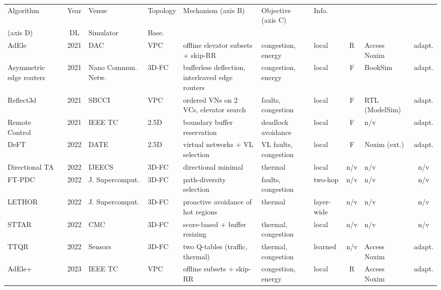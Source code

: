 \begin{tabularx}{\linewidth}{@{}>{\raggedright\arraybackslash}p{2.35cm}c>{\raggedright\arraybackslash}p{1.9cm}>{\raggedright\arraybackslash}p{1.35cm}>{\raggedright\arraybackslash}X>{\raggedright\arraybackslash}p{2.0cm}>{\raggedright\arraybackslash}p{1.3cm}c>{\raggedright\arraybackslash}p{1.45cm}c@{}}
\toprule
Algorithm & Year & Venue & Topology & Mechanism (axis B) & Objective (axis C) & Info.\\ (axis D) & DL & Simulator & Base. \\
\midrule
AdEle~\cite{taheri2021adele} & 2021 & DAC & VPC & offline elevator subsets + skip-RR & congestion, energy & local & R & Access Noxim & adapt. \\
Asymmetric edge routers~\cite{kunthara2021edge} & 2021 & Nano Commun. Netw. & 3D-FC & bufferless deflection, interleaved edge routers & congestion, energy & local & F & BookSim & adapt. \\
Reflect3d~\cite{silva2021reflect3d} & 2021 & SBCCI & VPC & 4 ordered VNs on 2 VCs, elevator search & faults, congestion & local & F & RTL (ModelSim) & adapt. \\
Remote Control~\cite{majumder2021remote} & 2021 & IEEE TC & 2.5D & boundary buffer reservation & deadlock avoidance & local & F & n/v & adapt. \\
DeFT~\cite{taheri2022deft} & 2022 & DATE & 2.5D & virtual networks + VL selection & VL faults, congestion & local & F & Noxim (ext.) & adapt. \\
Directional TA~\cite{kaleem2022directional} & 2022 & IJEECS & 3D-FC & directional minimal & thermal & local & n/v & n/v & n/v \\
FT-PDC~\cite{khodadadi2022ftpdc} & 2022 & J. Supercomput. & 3D-FC & path-diversity selection & faults, congestion & two-hop & n/v & n/v & n/v \\
LETHOR~\cite{safari2022lethor} & 2022 & J. Supercomput. & 3D-FC & proactive avoidance of hot regions & thermal & layer-wide & n/v & n/v & n/v \\
STTAR~\cite{fang2022sttar} & 2022 & CMC & 3D-FC & score-based + buffer resizing & thermal, congestion & local & n/v & n/v & n/v \\
TTQR~\cite{liu2022ttqr} & 2022 & Sensors & 3D-FC & two Q-tables (traffic, thermal) & thermal, congestion & learned & n/v & Access Noxim & adapt. \\
AdEle+~\cite{taheri2023adeleplus} & 2023 & IEEE TC & VPC & offline subsets + skip-RR & congestion, energy & local & R & Access Noxim & adapt. \\

\end{tabularx}
